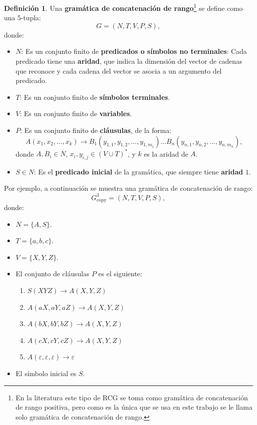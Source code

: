 \documentclass{report}
\theoremstyle{definition}
\newtheorem{definicion}{Definición}[chapter]
\theoremstyle{plain}
\theoremstyle{remark}
\begin{document}
\begin{definicion}
Una \textbf{gramática de concatenación de rango}\footnote{En la
literatura este tipo de RCG se toma como gramática de concatenación de
rango positiva, pero como es la única que se usa en este trabajo se le
llama solo gramática de concatenación de rango.} se define como una
$5$-tupla:
\[
  G = (N, T, V, P, S),
\]
donde:
\begin{itemize}
  \item $N$: Es un conjunto finito de \textbf{predicados o símbolos no
    terminales}: Cada predicado tiene una \textbf{aridad}, que indica la
    dimensión del vector de cadenas que reconoce y cada cadena del
    vector se asocia a un argumento del predicado.
  \item $T$: Es un conjunto finito de \textbf{símbolos terminales}.
  \item $V$: Es un conjunto finito de \textbf{variables}.
  \item $P$: Es un conjunto finito de \textbf{cláusulas}, de la forma:
    \[
      A(x_1, x_2, \dots, x_k) \to B_1(y_{1,1}, y_{1,2}, \dots, y_{1,m_1})
      \dots B_n(y_{n,1}, y_{n,2}, \dots, y_{n,m_n}),
    \]
    donde $A, B_i \in N$, $x_i, y_{i,j} \in (V \cup T)^*$, y $k$ es la
    aridad de $A$.
  \item $S \in N$: Es el \textbf{predicado inicial} de la gramática, que
    siempre tiene \textbf{aridad} $1$.
\end{itemize}
\end{definicion}

Por ejemplo, a continuación se muestra una gramática de concatenación de
rango:
\[
  G_{\mathrm{copy}}^3 = (N, T, V, P, S),
\]
donde:
\begin{itemize}
  \item $N = \{A, S\}$.
  \item $T = \{a, b, c\}$.
  \item $V = \{X, Y, Z\}$.
  \item El conjunto de cláusulas $P$ es el siguiente:
    \begin{enumerate}
      \item $S(XYZ) \to A(X, Y, Z)$
      \item $A(aX, aY, aZ) \to A(X, Y, Z)$
      \item $A(bX, bY, bZ) \to A(X, Y, Z)$
      \item $A(cX, cY, cZ) \to A(X, Y, Z)$
      \item $A(\varepsilon, \varepsilon, \varepsilon) \to \varepsilon$
    \end{enumerate}
  \item El símbolo inicial es $S$.
\end{itemize}
\end{document}
